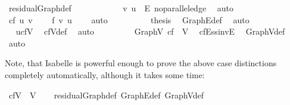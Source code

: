 \begin{isabellebody}
\ residualGraph{\isacharunderscore}def\isanewline
\ \ \ \ \ \ \ \ \ \ \isamarkupfalse%
\ {\isacharbackquoteopen}{\isacharparenleft}v{\isacharcomma}\ u{\isacharparenright}\ {\isasymin}\ E{\isacharbackquoteclose}\ no{\isacharunderscore}parallel{\isacharunderscore}edge\ \isamarkupfalse%
\ auto\isanewline
\ \ \ \ \ \ \ \ \isamarkupfalse%
\ \isamarkupfalse%
\ {\isachardoublequoteopen}cf\ {\isacharparenleft}u{\isacharcomma}\ v{\isacharparenright}\ {\isasymnoteq}\ {}{\isachardoublequoteclose}\ \isamarkupfalse%
\ {\isacartoucheopen}f\ {\isacharparenleft}v{\isacharcomma}\ u{\isacharparenright}\ {\isasymnoteq}\ {}{\isacartoucheclose}\ \isamarkupfalse%
\ auto\isanewline
\ \ \ \ \ \ \ \ \isamarkupfalse%
\ {\isacharquery}thesis\ \isamarkupfalse%
\ Graph{\isachardot}E{\isacharunderscore}def\ \isamarkupfalse%
\ auto\isanewline
\ \ \ \ \ \ \isamarkupfalse%
\isanewline
\ \ \ \ \isacommand{{\isacharbraceright}}\isamarkupfalse%
\ \isamarkupfalse%
\ \isamarkupfalse%
\ {\isachardoublequoteopen}u{\isasymin}cf{\isachardot}V{\isachardoublequoteclose}\ \isamarkupfalse%
\ cf{\isachardot}V{\isacharunderscore}def\ \isamarkupfalse%
\ auto\isanewline
\ \ \isamarkupfalse%
\ \ \isanewline
{}\isamarkupfalse%
\isanewline
\ \ \isamarkupfalse%
\ {\isachardoublequoteopen}Graph{\isachardot}V\ cf\ {\isasymsubseteq}\ V{\isachardoublequoteclose}\ \isamarkupfalse%
\ cfE{\isacharunderscore}ss{\isacharunderscore}invE\ \isamarkupfalse%
\ Graph{\isachardot}V{\isacharunderscore}def\ \isamarkupfalse%
\ auto\isanewline
{}\isamarkupfalse%
%
\endisatagproof
{\isafoldproof}%
%
\isadelimproof
%
\endisadelimproof
%
\begin{isamarkuptext}%
Note, that Isabelle is powerful enough to prove the above case 
  distinctions completely automatically, although it takes some time:%
\end{isamarkuptext}\isamarkuptrue%
\isamarkupfalse%
\ {\isachardoublequoteopen}cf{\isachardot}V\ {\isacharequal}\ V{\isachardoublequoteclose}\isanewline
%
\isadelimproof
\ \ %
\endisadelimproof
%
\isatagproof
{}\isamarkupfalse%
\ residualGraph{\isacharunderscore}def\ Graph{\isachardot}E{\isacharunderscore}def\ Graph{\isachardot}V{\isacharunderscore}def\isanewline

\end{isabellebody}

